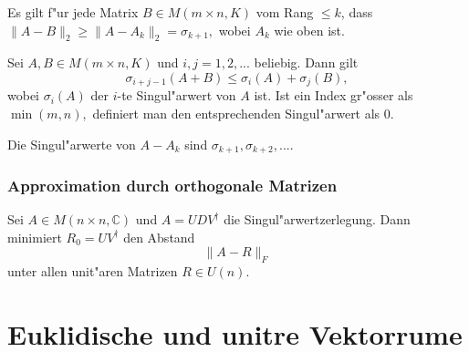\documentclass[8pt, a4paper, twocolumn, landscape]{article}
\begin{document}
\begin{remark}
Es gilt f"ur jede Matrix $B \in M( m \times n, K)$ vom Rang $\leq k$, dass \\
$
\|A - B\|_2 \geq \|A - A_k \|_2 = \sigma_{k+1},
$
wobei $A_k$ wie oben ist.
\end{remark}

\begin{corollary}
Sei $A, B \in M(m \times n, K)$ und $i, j = 1, 2, ...$ beliebig. Dann gilt
$$
\sigma_{i+j-1} (A+B) \leq \sigma_i(A) + \sigma_j(B), 
$$
wobei $ \sigma_i(A)$ der $i$-te Singul"arwert von $A$ ist. Ist ein Index gr"osser als $\min(m, n),$ definiert man den entsprechenden Singul"arwert als $0$.
\end{corollary}

\begin{remark}
Die Singul"arwerte von $A - A_k$ sind $\sigma_{k+1}, \sigma_{k+2}, ... .$
\end{remark}

\subsubsection{Approximation durch orthogonale Matrizen}
\begin{theorem}
Sei $A \in M(n \times n, \mathbb{C})$ und $A = UDV^\dagger$ die Singul"arwertzerlegung. Dann minimiert $R_0 = UV^\dagger$ den Abstand 
$$
\|A - R\|_F
$$
unter allen unit"aren Matrizen $R \in U(n)$.
\end{theorem}

\section{Euklidische und unit\aee re Vektorr\aee ume}
\end{document}
